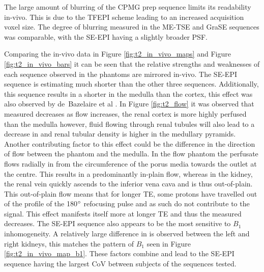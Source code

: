 The large amount of blurring of the \ac{CPMG} \ttwo prep sequence limits its readability in-vivo. This is due to the \ac{TFEPI} scheme leading to an increased acquisition voxel size. The degree of blurring measured in the \ac{ME-TSE} and \ac{GraSE} sequences was comparable, with the \ac{SE}-\ac{EPI} having a slightly broader \ac{PSF}.

Comparing the in-vivo data in Figure \ref{fig:t2_in_vivo_maps} and Figure \ref{fig:t2_in_vivo_bars} it can be seen that the relative strengths and weaknesses of each sequence observed in the phantoms are mirrored in-vivo. The \ac{SE}-\ac{EPI} sequence is estimating much shorter \ttwo than the other three sequences. Additionally, this sequence results in a shorter \ttwo in the medulla than the cortex, this effect was also observed by de~Bazelaire et al \cite{de_bazelaire_mr_2004}. In Figure \ref{fig:t2_flow} it was observed that measured \ttwo decreases as flow increases, the renal cortex is more highly perfused than the medulla \cite{buchanan_quantitative_2019, nery_consensus-based_2020} however, fluid flowing through renal tubules will also lead to a decrease in \ttwo and renal tubular density is higher in the medullary pyramids. Another contributing factor to this effect could be the difference in the direction of flow between the phantom and the medulla. In the flow phantom the perfusate flows radially in from the circumference  of the porus media towards the outlet at the centre. This results in a predominantly in-plain flow, whereas in the kidney, the renal vein quickly ascends to the inferior vena cava and is thus out-of-plain. This out-of-plain flow means that for longer \ac{TE}, some protons have travelled out of the profile of the 180$\degree$ refocusing pulse and as such do not contribute to the signal. This effect manifests itself more at longer \ac{TE} and thus the measured \ttwo decreases. The \ac{SE}-\ac{EPI} sequence also appears to be the most sensitive to $B_1$ inhomogeneity. A relatively large difference in \ttwo is observed between the left and right kidneys, this matches the pattern of $B_1$ seen in Figure \ref{fig:t2_in_vivo_map_b1}. These factors combine and lead to the \ac{SE}-\ac{EPI} sequence having the largest \ac{CoV} between subjects of the sequences tested.

